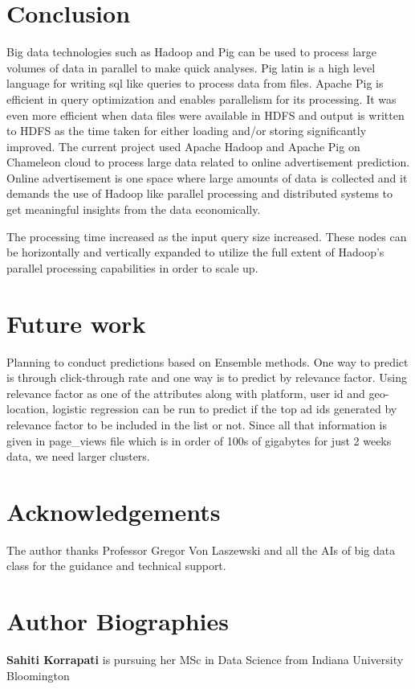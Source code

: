 \documentclass[9pt,twocolumn,twoside]{../../styles/osajnl}
\begin{document}
\section{Conclusion}
Big data technologies such as Hadoop and Pig can be used to process large volumes of data in parallel to make quick analyses. Pig latin is a high level language for writing sql like queries to process data from files. Apache Pig is efficient in query optimization and enables parallelism for its processing. It was even more efficient when data files were available in HDFS and output is written to HDFS as the time taken for either loading and/or storing significantly improved. The current project used Apache Hadoop and Apache Pig on Chameleon cloud to process large data related to online advertisement prediction. Online advertisement is one space where large amounts of data is collected and it demands the use of Hadoop like parallel processing and distributed systems to get meaningful insights from the data economically.

The processing time increased as the input query size increased. These nodes can be horizontally and vertically expanded to utilize the full extent of Hadoop's parallel processing capabilities in order to scale up.

\section{Future work}

Planning to conduct predictions based on Ensemble methods. One way to predict is through click-through rate and one way is to predict by relevance factor. Using relevance factor as one of the attributes along with platform, user id and geo-location, logistic regression can be run to predict if the top ad ids generated by relevance factor to be included in the list or not. Since all that information is given in page\_views file which is in order of 100s of gigabytes for just 2 weeks data, we need larger clusters. 

\section*{Acknowledgements}
The author thanks Professor Gregor Von Laszewski and all the AIs of big data class for the guidance and technical support.


 
\section*{Author Biographies}
\begingroup
\setlength\intextsep{0pt}
\begin{minipage}[t][3.2cm][t]{1.0\columnwidth} %
  \noindent
  {\bfseries Sahiti Korrapati} is pursuing her MSc in Data Science from
  Indiana University Bloomington
\end{minipage}
\endgroup
\newpage
\appendix
\end{document}
